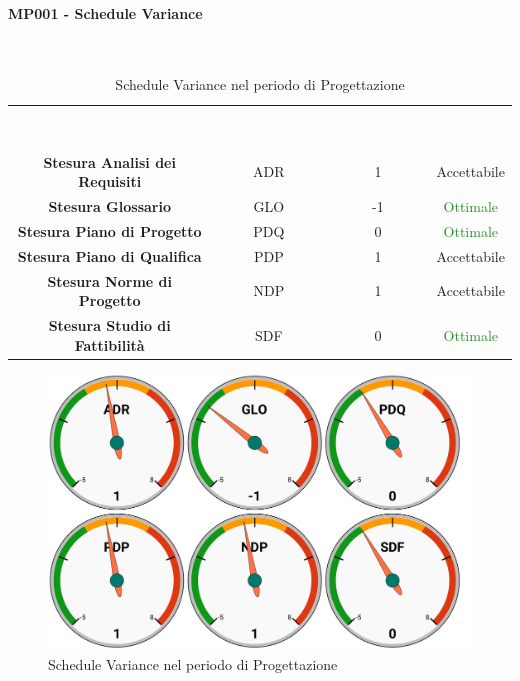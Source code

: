 \paragraph{MP001 - Schedule Variance}\mbox{}\\[0,3cm]
\begin{table}[H]
    \centering
    \begin{tabular}{cccc}
        \rowcolor{greySWEight}
        \textcolor{white}{\textbf{Attività}} & 
        \textcolor{white}{\textbf{Abbreviazione}} &
        \textcolor{white}{\textbf{Valore Indice}}&
        \textcolor{white}{\textbf{Riscontro}}\\
		\textbf{Stesura Analisi dei Requisiti} & ADR & 1 & \textcolor{YellowOrange}{Accettabile}\\
		\textbf{Stesura Glossario} & GLO & -1 & \textcolor{ForestGreen}{Ottimale} \\
		\textbf{Stesura Piano di Progetto} & PDQ & 0 & \textcolor{ForestGreen}{Ottimale} \\
		\textbf{Stesura Piano di Qualifica} & PDP & 1 & \textcolor{YellowOrange}{Accettabile} \\
		\textbf{Stesura Norme di Progetto} & NDP & 1 & \textcolor{YellowOrange}{Accettabile} \\
		\textbf{Stesura Studio di Fattibilità} & SDF & 0 & \textcolor{ForestGreen}{Ottimale} \\

    \end{tabular}
    \caption{Schedule Variance nel periodo di Progettazione}
\end{table}
\begin{figure}[H]
    \centering
	\includegraphics[width=1\linewidth]{sez/App_Esito/Progettazione/graph/PR_SV.pdf}
	\caption{Schedule Variance nel periodo di Progettazione}
\end{figure}


